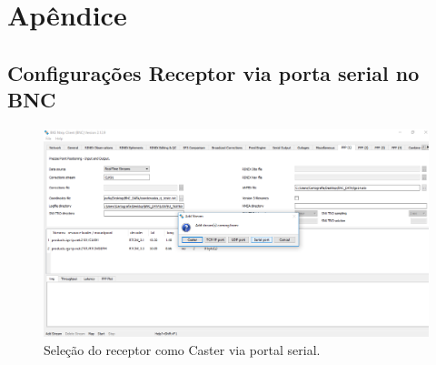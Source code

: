%
%
% 
%


\chapter{Apêndice}
\noindent


\section{Configurações Receptor via porta serial no BNC}

\begin{figure}[H]
\centering
\includegraphics[scale=0.4]{img/18bnc.png} %
\caption{Seleção do receptor como Caster via portal serial.}
\label{Rotulo}
\end{figure}


